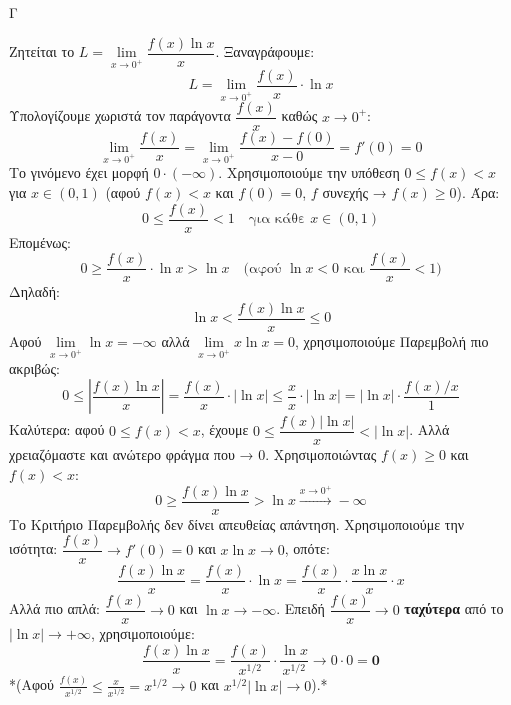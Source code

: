 \begin{thema}{Γ}
\begin{erwthma}
\item Ζητείται το $L = \lim\limits_{x \to 0^+} \dfrac{f(x)\ln x}{x}$.
Ξαναγράφουμε:
\[ L = \lim_{x \to 0^+} \frac{f(x)}{x} \cdot \ln x \]
Υπολογίζουμε χωριστά τον παράγοντα $\dfrac{f(x)}{x}$ καθώς $x \to 0^+$:
\[ \lim_{x \to 0^+} \frac{f(x)}{x} = \lim_{x \to 0^+} \frac{f(x) - f(0)}{x - 0} = f'(0) = 0 \]
Το γινόμενο έχει μορφή $0 \cdot (-\infty)$. Χρησιμοποιούμε την υπόθεση $0 \le f(x) < x$ για $x \in (0,1)$ (αφού $f(x) < x$ και $f(0) = 0$, $f$ συνεχής → $f(x) \ge 0$).
Άρα:
\[ 0 \le \frac{f(x)}{x} < 1 \quad \text{για κάθε } x \in (0,1) \]
Επομένως:
\[ 0 \ge \frac{f(x)}{x} \cdot \ln x > \ln x \quad \text{(αφού } \ln x < 0 \text{ και } \frac{f(x)}{x} < 1\text{)} \]
Δηλαδή:
\[ \ln x < \frac{f(x)\ln x}{x} \le 0 \]
Αφού $\lim\limits_{x \to 0^+} \ln x = -\infty$ αλλά $\lim\limits_{x \to 0^+} x\ln x = 0$, χρησιμοποιούμε Παρεμβολή πιο ακριβώς:
\[ 0 \le \left|\frac{f(x)\ln x}{x}\right| = \frac{f(x)}{x}\cdot|\ln x| \le \frac{x}{x} \cdot |\ln x| = |\ln x| \cdot \frac{f(x)/x}{1} \]
Καλύτερα: αφού $0 \le f(x) < x$, έχουμε $0 \le \dfrac{f(x)|\ln x|}{x} < |\ln x|$. Αλλά χρειαζόμαστε και ανώτερο φράγμα που → 0.
Χρησιμοποιώντας $f(x) \ge 0$ και $f(x) < x$:
\[ 0 \ge \frac{f(x)\ln x}{x} > \ln x \xrightarrow{x\to 0^+} -\infty \]
Το Κριτήριο Παρεμβολής δεν δίνει απευθείας απάντηση. Χρησιμοποιούμε την ισότητα:
$\dfrac{f(x)}{x} \to f'(0) = 0$ και $x\ln x \to 0$, οπότε:
\[ \frac{f(x)\ln x}{x} = \frac{f(x)}{x} \cdot \ln x = \frac{f(x)}{x} \cdot \frac{x\ln x}{x} \cdot x \]
Αλλά πιο απλά: $\dfrac{f(x)}{x} \to 0$ και $\ln x \to -\infty$. Επειδή $\dfrac{f(x)}{x} \to 0$ \textbf{ταχύτερα} από το $|\ln x| \to +\infty$, χρησιμοποιούμε:
\[ \frac{f(x)\ln x}{x} = \frac{f(x)}{x^{1/2}} \cdot \frac{\ln x}{x^{1/2}} \to 0 \cdot 0 = \boldsymbol{0} \]
*(Αφού $\frac{f(x)}{x^{1/2}} \le \frac{x}{x^{1/2}} = x^{1/2} \to 0$ και $x^{1/2}|\ln x| \to 0$).*
\end{erwthma}
\end{thema}

